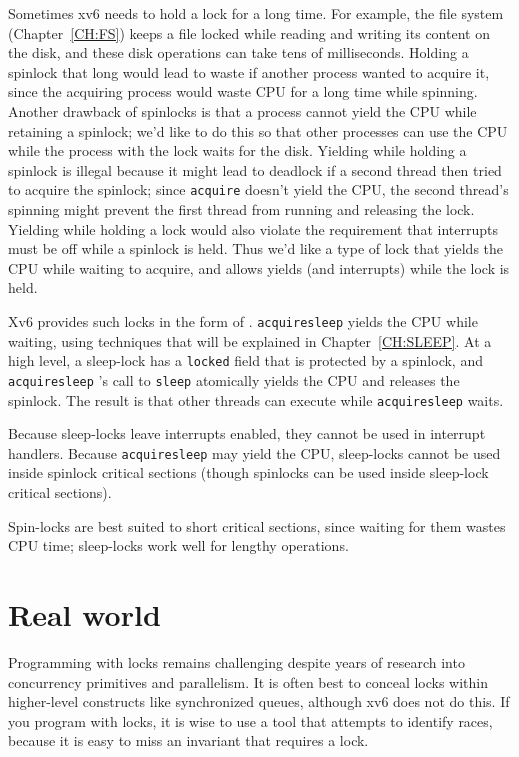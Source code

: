 Sometimes xv6 needs to hold a lock for a long time. For example, the
file system (Chapter~\ref{CH:FS}) keeps a file locked while reading
and writing its content on the disk, and these disk operations can
take tens of milliseconds. Holding a spinlock that long would lead to
waste if another process wanted to acquire it, since the acquiring
process would waste CPU for a long time while spinning. Another
drawback of spinlocks is that a process cannot yield the CPU while
retaining a spinlock; we'd like to do this so that other processes can
use the CPU while the process with the lock waits for the disk.
Yielding while holding a spinlock is illegal because it might
lead to deadlock if a second thread then tried to acquire the spinlock;
since {\tt acquire} doesn't yield the CPU, the second thread's
spinning might
prevent the first thread from running and releasing the lock.
Yielding while holding a lock would also violate
the requirement that interrupts must be off while a spinlock is held.
Thus we'd like a type of lock that yields the CPU while waiting to
acquire, and allows yields (and interrupts) while the lock is held.

Xv6 provides such locks in the form of
.
\lstinline{acquiresleep}
yields the CPU while waiting,
using techniques that will be explained in
Chapter~\ref{CH:SLEEP}.
At a high level, a sleep-lock has a
\lstinline{locked}
field that is protected by a spinlock, and 
\lstinline{acquiresleep} 's
call to
\lstinline{sleep}
atomically yields the CPU and releases the spinlock.
The result is that other threads can execute while
\lstinline{acquiresleep}
waits.

Because sleep-locks leave interrupts enabled, they cannot be
used in interrupt handlers.
Because
\lstinline{acquiresleep}
may yield the CPU,
sleep-locks cannot be used inside spinlock critical
sections (though spinlocks can be used inside sleep-lock
critical sections).

Spin-locks are best suited to short critical sections,
since waiting for them wastes CPU time;
sleep-locks work well for lengthy operations.

\section{Real world}
Programming with locks remains challenging despite years of research
into concurrency primitives and parallelism.
It is often best to conceal locks within 
higher-level constructs like synchronized queues, although xv6 does not
do this.  If you program with locks, it is wise to use a tool that attempts to
identify races, because it is easy to miss an invariant that requires
a lock.

